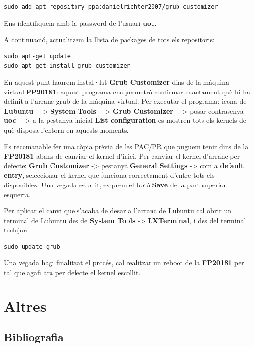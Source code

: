 \documentclass[
]{book}
\begin{document}
\begin{verbatim}
sudo add-apt-repository ppa:danielrichter2007/grub-customizer
\end{verbatim}

Ens identifiquem amb la password de l'usuari \textbf{uoc}.

A continuació, actualitzem la llista de packages de tots els repositoris:

\begin{verbatim}
sudo apt-get update
sudo apt-get install grub-customizer
\end{verbatim}

En aquest punt haurem instal·lat \textbf{Grub Customizer} dins de la màquina virtual \textbf{FP20181}: aquest programa ens permetrà confirmar exactament què hi ha definit a l'arranc grub de la màquina virtual. Per executar el programa: icona de \textbf{Lubuntu} ---\textgreater{} \textbf{System Tools} ---\textgreater{} \textbf{Grub Customizer} ---\textgreater{} posar contrasenya \textbf{uoc} ---\textgreater{} a la pestanya inicial \textbf{List configuration} es mostren tots els kernels de què disposa l'entorn en aquests moments.

Es recomanable fer una còpia prèvia de les PAC/PR que puguem tenir dins de la \textbf{FP20181} abans de canviar el kernel d'inici. Per canviar el kernel d'arranc per defecte: \textbf{Grub Customizer} -\textgreater{} pestanya \textbf{General Settings} -\textgreater{} com a \textbf{default entry}, seleccionar el kernel que funciona correctament d'entre tots els disponibles. Una vegada escollit, es prem el botó \textbf{Save} de la part superior esquerra.

Per aplicar el canvi que s'acaba de desar a l'arranc de Lubuntu cal obrir un terminal de Lubuntu des de \textbf{System Tools} -\textgreater{} \textbf{LXTerminal}, i des del terminal teclejar:

\begin{verbatim}
sudo update-grub
\end{verbatim}

Una vegada hagi finalitzat el procés, cal realitzar un reboot de la \textbf{FP20181} per tal que agafi ara per defecte el kernel escollit.

\hypertarget{altres}{%
\chapter{Altres}\label{altres}}

\hypertarget{bibliografia}{%
\section{Bibliografia}\label{bibliografia}}
\end{document}
